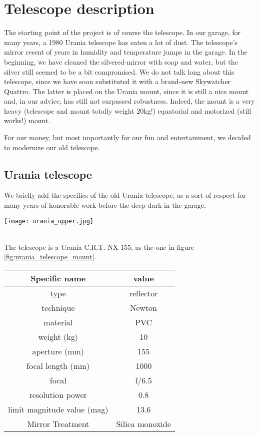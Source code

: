 \section{Telescope description}
\label{sec:telescope-description}
The starting point of the project is of course the telescope.
In our garage, for many years, a 1980 Urania telescope has eaten a lot of dust.
The telescope's mirror resent of years in humidity and temperature jumps in the garage.
In the beginning, we have cleaned the silvered-mirror with soap and water, but the silver still seemed to be a bit compromised.
We do not talk long about this telescope, since we have soon substituted it with a brand-new Skywatcher Quattro.
The latter is placed on the Urania mount, since it is still a nice mount and, in our advice, has still not surpassed robustness.
Indeed, the mount is a very heavy (telescope and mount totally weight 20kg!) equatorial and motorized (still works!) mount.

For our money, but most importantly for our fun and entertainment, we decided to modernize our old telescope.

\subsection{Urania telescope}
We briefly add the specifics of the old Urania telescope, as a sort of respect for many years of honorable work before the deep dark in the garage.
\\
\begin{minipage}{0.5\textwidth}
    \centering
    \texttt{[image: urania\_upper.jpg]}
    \label{fig:urania_telescope_mount}
\end{minipage}
\\
The telescope is a Urania C.R.T. NX 155, as the one in figure \ref{fig:urania_telescope_mount}.
\\
\begin{minipage}{0.5\textwidth}
    \centering
    \begin{tabular}{c|c}
        Specific name & value \\
        \hline
        type & reflector \\
        technique & Newton  \\
        material & PVC  \\
        weight (kg) & 10 \\
        aperture (mm) & 155 \\
        focal length (mm) & 1000 \\
        focal & f/6.5 \\
        resolution power & 0.8 \\
        limit magnitude value (mag) & 13.6 \\
        Mirror Treatment & Silica monoxide \\
        \hline
    \end{tabular}
\end{minipage}

